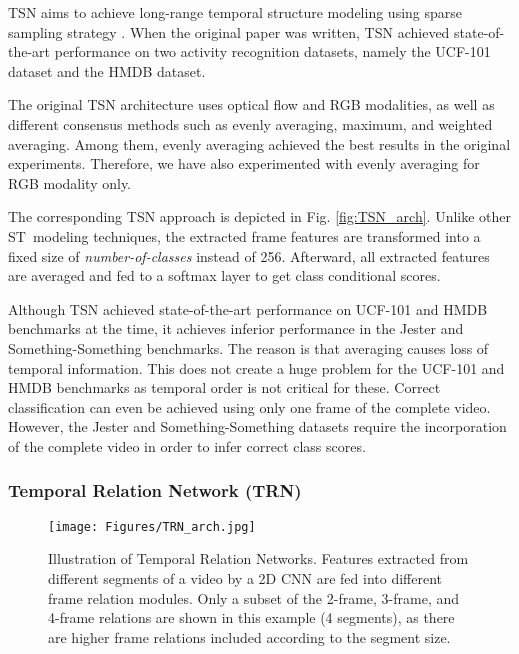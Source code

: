 \documentclass[runningheads]{llncs}
\begin{document}
TSN aims to achieve long-range temporal structure modeling using sparse sampling strategy \cite{Wang2016-gj}. When the original paper was written, TSN achieved state-of-the-art performance on two activity recognition datasets, namely the UCF-101 \cite{soomro2012ucf101} dataset and the HMDB \cite{kuehne2011hmdb} dataset.

The original TSN architecture uses optical flow and RGB modalities, as well as different consensus methods such as evenly averaging, maximum, and weighted averaging. Among them, evenly averaging achieved the best results in the original experiments. Therefore, we have also experimented with evenly averaging for RGB modality only.

The corresponding TSN approach is depicted in Fig. \ref{fig:TSN_arch}. Unlike other ST~modeling techniques, the extracted frame features are transformed into a fixed size of \textit{number-of-classes} instead of 256. Afterward, all extracted features are averaged and fed to a softmax layer to get class conditional scores. 

Although TSN achieved state-of-the-art performance on UCF-101 and HMDB benchmarks at the time, it achieves inferior performance in the Jester and Something-Something benchmarks. The reason is that averaging causes loss of  temporal information. This does not create a huge problem for the UCF-101 and HMDB benchmarks as temporal order is not critical for these. Correct classification can even be achieved using only one frame of the complete video. However, the Jester and Something-Something datasets require the incorporation of the complete video in order to infer correct class scores.





\subsubsection{Temporal Relation Network (TRN)} 





\begin{figure*}[t!]
	\centering
	\texttt{[image: Figures/TRN\_arch.jpg]}
	\caption{Illustration of Temporal Relation Networks. Features extracted from different segments of a video by a 2D CNN are fed into different frame relation modules. Only a subset of the 2-frame, 3-frame, and 4-frame relations are shown in this example (4 segments), as there are higher frame relations included according to the segment size.}
	\label{fig:TRN_arch}
\end{figure*}
\end{document}
